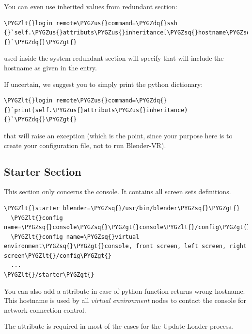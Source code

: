 \documentclass[a4,10pt,openany,oneside]{sphinxmanual}
\def\PYGZus{\char`\_}
\def\PYGZlt{\char`\<}
\def\PYGZgt{\char`\>}
\def\PYGZsq{\char`\'}
\def\PYGZdq{\char`\"}
\begin{document}
You can even use inherited values from redundant section:

\begin{Verbatim}[commandchars=\\\{\}]
\PYGZlt{}login remote\PYGZus{}command=\PYGZdq{}ssh {}`self.\PYGZus{}attributs\PYGZus{}inheritance[\PYGZsq{}hostname\PYGZsq{}]{}`\PYGZdq{}\PYGZgt{}
\end{Verbatim}

used inside the system redundant section will specify that  will include the hostname as given in the  entry.

If uncertain, we suggest you to simply print the  python dictionary:

\begin{Verbatim}[commandchars=\\\{\}]
\PYGZlt{}login remote\PYGZus{}command=\PYGZdq{}{}`print(self.\PYGZus{}attributs\PYGZus{}inheritance){}`\PYGZdq{}\PYGZgt{}
\end{Verbatim}

that will raise an exception (which is the point, since your purpose here is to create your configuration file, not to run Blender-VR).


\subsection{Starter Section}
\label{components/configuration-file:starter-section}
This section only concerns the console. It contains all screen sets definitions.

\begin{Verbatim}[commandchars=\\\{\}]
\PYGZlt{}starter blender=\PYGZsq{}/usr/bin/blender\PYGZsq{}\PYGZgt{}
  \PYGZlt{}config name=\PYGZsq{}console\PYGZsq{}\PYGZgt{}console\PYGZlt{}/config\PYGZgt{}
  \PYGZlt{}config name=\PYGZsq{}virtual environment\PYGZsq{}\PYGZgt{}console, front screen, left screen, right screen\PYGZlt{}/config\PYGZgt{}
  ...
\PYGZlt{}/starter\PYGZgt{}
\end{Verbatim}

You can also add a  attribute in case of  python function returns wrong hostname. This hostname is used by all \emph{virtual environment} nodes to contact the console for network connection control.

The  attribute is required in most of the cases for the Update Loader  process.
\end{document}
